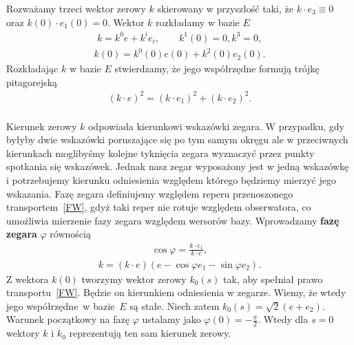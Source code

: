Rozważamy trzeci wektor zerowy $k$ skierowany w przyszłość taki, 
że $k\cdot e_3 \equiv 0$ oraz $k(0)\cdot e_1(0) =0$.  
Wektor $k$ rozkładamy w bazie $E$
\begin{align*}
k = k^0 e +  k^i e_i, \qquad k^1(0)=0, k^3 = 0,
\end{align*}
\begin{align*}
k(0) = k^0(0) e(0) + k^2(0) e_2(0) .
\end{align*}
Rozkładając $k$ w bazie $E$ stwierdzamy, że jego współrzędne 
formują trójkę pitagorejską 
\begin{align}
(k \cdot e)^2 = (k \cdot e_1)^2 +  (k \cdot e_2)^2 .
\end{align}
\\
Kierunek zerowy $k$ odpowiada kierunkowi wskazówki zegara. 
 W przypadku, gdy byłyby 
dwie wskazówki poruszające się po tym samym okręgu ale w 
przeciwnych kierunkach moglibyśmy kolejne tyknięcia zegara
wyznaczyć przez punkty spotkania się wskazówek. 
Jednak nasz zegar wyposażony jest w jedną wskazówkę i 
potrzebujemy kierunku odniesienia względem którego będziemy 
mierzyć jego wskazania. Fazę zegara definiujemy względem reperu
przenoszonego transportem~\eqref{FW}, gdyż taki reper nie 
rotuje względem obserwatora, co umożliwia mierzenie  
fazy zegara względem wersorów bazy. 
Wprowadzamy \textbf{fazę zegara} $\varphi$ 
równością
\begin{align}\label{phi_definition}
\cos\varphi = \frac{k\cdot e_1}{k\cdot e} ,
\end{align}
\begin{align*}
k = (k\cdot e) (e -\cos\varphi e_1 - \sin\varphi e_2 ).
\end{align*}
Z wektora $k(0)$ tworzymy wektor zerowy $k_0(s)$ tak, aby spełniał 
prawo transportu~\eqref{FW}. Będzie on kierunkiem odniesienia 
w zegarze. Wiemy, że wtedy jego współrzędne~w 
bazie~$E$ są stałe. Niech zatem
$k_0(s) =  \sqrt{2} (e + e_2)$.
Warunek początkowy na fazę $\varphi$ ustalamy jako
$\varphi(0)=-\frac{\pi}{2}$. Wtedy dla $s=0$ wektory
$k$ i $k_0$ reprezentują ten sam kierunek zerowy. 
